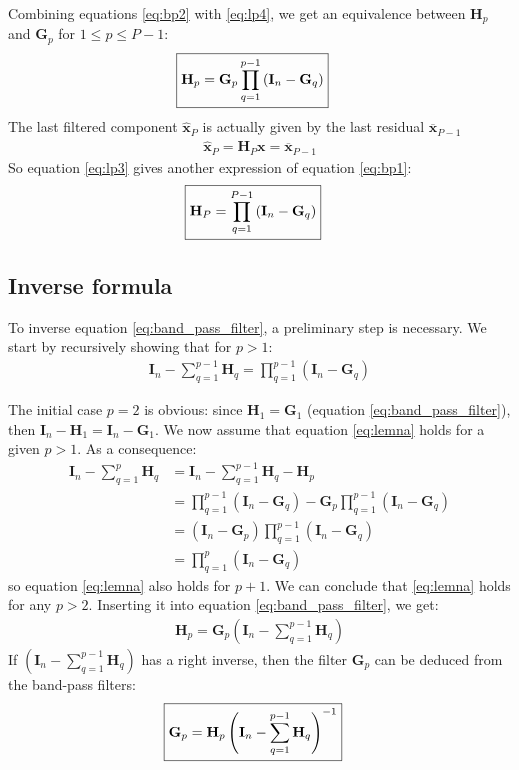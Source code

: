 \documentclass[12pt]{scrartcl}
\begin{document}
Combining equations \eqref{eq:bp2} with \eqref{eq:lp4}, we get an equivalence between $\mathbf{H}_p$ and $\mathbf{G}_p$ for $1 \le p \le P-1$:
\begin{align}
\label{eq:band_pass_filter}
\Aboxed{\mathbf{H}_p = \mathbf{G}_p \prod_{q=1}^{p-1} \left(\mathbf{I}_n - \mathbf{G}_q\right)}
\end{align}
The last filtered component $\widehat{\mathbf{x}}_P$ is actually given by the last residual $\overline{\mathbf{x}}_{P-1}$
\begin{align}
\widehat{\mathbf{x}}_P = \mathbf{H}_P \mathbf{x} = \overline{\mathbf{x}}_{P-1}
\end{align}
So equation \eqref{eq:lp3} gives another expression of equation \eqref{eq:bp1}:
\begin{align}
\Aboxed{\mathbf{H}_P = \prod_{q=1}^{P-1} \left(\mathbf{I}_n - \mathbf{G}_q\right)}
\end{align}

\subsection{Inverse formula}

To inverse equation \eqref{eq:band_pass_filter}, a preliminary step is necessary. We start by recursively showing that for $p > 1$:
\begin{align}
\label{eq:lemna}
\mathbf{I}_n - \sum_{q=1}^{p-1} \mathbf{H}_q = \prod_{q=1}^{p-1} \left(\mathbf{I}_n - \mathbf{G}_q\right)
\end{align}

The initial case $p = 2$ is obvious: since $\mathbf{H}_1 = \mathbf{G}_1$ (equation \eqref{eq:band_pass_filter}), then $\mathbf{I}_n - \mathbf{H}_1 = \mathbf{I}_n - \mathbf{G}_1$. We now assume that equation \eqref{eq:lemna} holds for a given $p > 1$. As a consequence:
\begin{align}
\mathbf{I}_n - \sum_{q=1}^p \mathbf{H}_q & = \mathbf{I}_n - \sum_{q=1}^{p-1} \mathbf{H}_q - \mathbf{H}_p \nonumber \\
& = \prod_{q=1}^{p-1} \left(\mathbf{I}_n - \mathbf{G}_q\right) - \mathbf{G}_p \prod_{q=1}^{p-1} \left(\mathbf{I}_n - \mathbf{G}_q\right) \nonumber \\
& = \left(\mathbf{I}_n - \mathbf{G}_p\right) \prod_{q=1}^{p-1} \left(\mathbf{I}_n - \mathbf{G}_q\right) \nonumber \\
& = \prod_{q=1}^p \left(\mathbf{I}_n - \mathbf{G}_q\right)
\end{align}
so equation \eqref{eq:lemna} also holds for $p+1$. We can conclude that \eqref{eq:lemna} holds for any $p > 2$. Inserting it into equation \eqref{eq:band_pass_filter}, we get:
\begin{align}
\mathbf{H}_p = \mathbf{G}_p \left(\mathbf{I}_n - \sum_{q=1}^{p-1} \mathbf{H}_q\right)
\end{align}
If $\displaystyle \left(\mathbf{I}_n - \sum_{q=1}^{p-1} \mathbf{H}_q\right)$ has a right inverse, then the filter $\mathbf{G}_p$ can be deduced from the band-pass filters:
\begin{align}
\Aboxed{\mathbf{G}_p = \mathbf{H}_p \left(\mathbf{I}_n - \sum_{q=1}^{p-1} \mathbf{H}_q\right)^{-1}}
\end{align}
\end{document}

